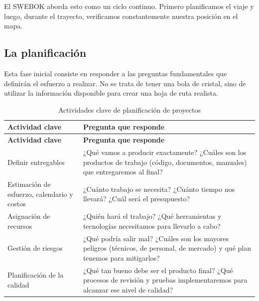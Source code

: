 El SWEBOK aborda esto como un ciclo continuo. 
Primero planificamos el viaje y luego, durante el trayecto, verificamos constantemente nuestra posición en el mapa.

\subsection*{La planificación}
Esta fase inicial consiste en responder a las preguntas fundamentales que definirán el esfuerzo a realizar. 
No se trata de tener una bola de cristal, sino de utilizar la información disponible para crear una hoja de ruta realista.

\begin{longtable}{p{4cm} p{10cm}}
\caption{Actividades clave de planificación de proyectos} \\
\toprule
\textbf{Actividad clave} & \textbf{Pregunta que responde} \\
\midrule
\endfirsthead

\toprule
\textbf{Actividad clave} & \textbf{Pregunta que responde} \\
\midrule
\endhead

\bottomrule
\endfoot

Definir entregables & ¿Qué vamos a producir exactamente? ¿Cuáles son los productos de trabajo (código, documentos, manuales) que entregaremos al final? \\

Estimación de esfuerzo, calendario y costos & ¿Cuánto trabajo se necesita? ¿Cuánto tiempo nos llevará? ¿Cuál será el presupuesto? \\

Asignación de recursos & ¿Quién hará el trabajo? ¿Qué herramientas y tecnologías necesitamos para llevarlo a cabo? \\

Gestión de riesgos & ¿Qué podría salir mal? ¿Cuáles son los mayores peligros (técnicos, de personal, de mercado) y qué plan tenemos para mitigarlos? \\

Planificación de la calidad & ¿Qué tan bueno debe ser el producto final? ¿Qué procesos de revisión y pruebas implementaremos para alcanzar ese nivel de calidad? \\
\end{longtable}

